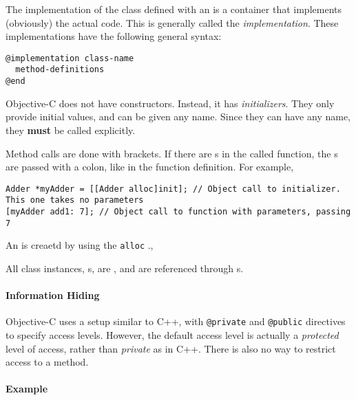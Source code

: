 \begin{definition}[Implementation]\label{def:Objective_C_Class_Implementation}
  The implementation of the  class defined with an  is a container that implements (obviously) the actual code.
  This is generally called the \emph{implementation}.
  These implementations have the following general syntax:
\begin{verbatim}
@implementation class-name
  method-definitions
@end
\end{verbatim}
\end{definition}

\begin{definition}[Initializers]\label{def:Objective_C_Class_Initializers}
  Objective-C does not have constructors.
  Instead, it has \emph{initializers}.
  They only provide initial values, and can be given any name.
  Since they can have any name, they \textbf{must} be called explicitly.
\end{definition}

Method calls are done with brackets.
If there are s in the called function, the s are passed with a colon, like in the function definition.
For example,
\begin{verbatim}
Adder *myAdder = [[Adder alloc]init]; // Object call to initializer. This one takes no parameters
[myAdder add1: 7]; // Object call to function with parameters, passing 7
\end{verbatim}

An  is creaetd by using the \texttt{alloc} .,

All class instances, s, are , and are referenced through s.

\paragraph{Information Hiding}\label{par:Objective_C_Info_Hiding}
Objective-C uses a setup similar to C++, with \texttt{@private} and \texttt{@public} directives to specify access levels.
However, the default access level is actually a \textit{protected} level of access, rather than \textit{private} as in C++.
There is also no way to restrict access to a method.

\paragraph{Example}\label{par:Objective_C_Abstract_Data_Type_Example}
\inputminted[frame=lines,linenos]{objective-c}{./EDAP05-Concepts_Programming_Languages-Sections/Code/Class_Example-Stack-Objective_C.m}

